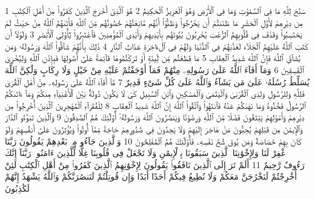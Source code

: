 {\tiny\colorbox{cl_aya}{1}} سَبَّحَ لِلَّهِ مَا فِى ٱلسَّمَٰوَٰتِ وَمَا فِى ٱلْأَرْضِ وَهُوَ ٱلْعَزِيزُ ٱلْحَكِيمُ
{\tiny\colorbox{cl_aya}{2}} هُوَ ٱلَّذِىٓ أَخْرَجَ ٱلَّذِينَ كَفَرُوا۟ مِنْ أَهْلِ ٱلْكِتَٰبِ مِن دِيَٰرِهِمْ لِأَوَّلِ ٱلْحَشْرِ مَا ظَنَنتُمْ أَن يَخْرُجُوا۟ وَظَنُّوٓا۟ أَنَّهُم مَّانِعَتُهُمْ حُصُونُهُم مِّنَ ٱللَّهِ فَأَتَىٰهُمُ ٱللَّهُ مِنْ حَيْثُ لَمْ يَحْتَسِبُوا۟ وَقَذَفَ فِى قُلُوبِهِمُ ٱلرُّعْبَ يُخْرِبُونَ بُيُوتَهُم بِأَيْدِيهِمْ وَأَيْدِى ٱلْمُؤْمِنِينَ فَٱعْتَبِرُوا۟ يَٰٓأُو۟لِى ٱلْأَبْصَٰرِ
{\tiny\colorbox{cl_aya}{3}} وَلَوْلَآ أَن كَتَبَ ٱللَّهُ عَلَيْهِمُ ٱلْجَلَآءَ لَعَذَّبَهُمْ فِى ٱلدُّنْيَا وَلَهُمْ فِى ٱلْءَاخِرَةِ عَذَابُ ٱلنَّارِ
{\tiny\colorbox{cl_aya}{4}} ذَٰلِكَ بِأَنَّهُمْ شَآقُّوا۟ ٱللَّهَ وَرَسُولَهُۥ وَمَن يُشَآقِّ ٱللَّهَ فَإِنَّ ٱللَّهَ شَدِيدُ ٱلْعِقَابِ
{\tiny\colorbox{cl_aya}{5}} مَا قَطَعْتُم مِّن لِّينَةٍ أَوْ تَرَكْتُمُوهَا قَآئِمَةً عَلَىٰٓ أُصُولِهَا فَبِإِذْنِ ٱللَّهِ وَلِيُخْزِىَ ٱلْفَٰسِقِينَ
{\tiny\colorbox{cl_aya}{6}} وَمَآ أَفَآءَ ٱللَّهُ عَلَىٰ رَسُولِهِۦ مِنْهُمْ فَمَآ أَوْجَفْتُمْ عَلَيْهِ مِنْ خَيْلٍ وَلَا رِكَابٍ وَلَٰكِنَّ ٱللَّهَ يُسَلِّطُ رُسُلَهُۥ عَلَىٰ مَن يَشَآءُ وَٱللَّهُ عَلَىٰ كُلِّ شَىْءٍ قَدِيرٌ
{\tiny\colorbox{cl_aya}{7}} مَّآ أَفَآءَ ٱللَّهُ عَلَىٰ رَسُولِهِۦ مِنْ أَهْلِ ٱلْقُرَىٰ فَلِلَّهِ وَلِلرَّسُولِ وَلِذِى ٱلْقُرْبَىٰ وَٱلْيَتَٰمَىٰ وَٱلْمَسَٰكِينِ وَٱبْنِ ٱلسَّبِيلِ كَىْ لَا يَكُونَ دُولَةًۢ بَيْنَ ٱلْأَغْنِيَآءِ مِنكُمْ وَمَآ ءَاتَىٰكُمُ ٱلرَّسُولُ فَخُذُوهُ وَمَا نَهَىٰكُمْ عَنْهُ فَٱنتَهُوا۟ وَٱتَّقُوا۟ ٱللَّهَ إِنَّ ٱللَّهَ شَدِيدُ ٱلْعِقَابِ
{\tiny\colorbox{cl_aya}{8}} لِلْفُقَرَآءِ ٱلْمُهَٰجِرِينَ ٱلَّذِينَ أُخْرِجُوا۟ مِن دِيَٰرِهِمْ وَأَمْوَٰلِهِمْ يَبْتَغُونَ فَضْلًا مِّنَ ٱللَّهِ وَرِضْوَٰنًا وَيَنصُرُونَ ٱللَّهَ وَرَسُولَهُۥٓ أُو۟لَٰٓئِكَ هُمُ ٱلصَّٰدِقُونَ
{\tiny\colorbox{cl_aya}{9}} وَٱلَّذِينَ تَبَوَّءُو ٱلدَّارَ وَٱلْإِيمَٰنَ مِن قَبْلِهِمْ يُحِبُّونَ مَنْ هَاجَرَ إِلَيْهِمْ وَلَا يَجِدُونَ فِى صُدُورِهِمْ حَاجَةً مِّمَّآ أُوتُوا۟ وَيُؤْثِرُونَ عَلَىٰٓ أَنفُسِهِمْ وَلَوْ كَانَ بِهِمْ خَصَاصَةٌ وَمَن يُوقَ شُحَّ نَفْسِهِۦ فَأُو۟لَٰٓئِكَ هُمُ ٱلْمُفْلِحُونَ
{\tiny\colorbox{cl_aya}{10}} وَٱلَّذِينَ جَآءُو مِنۢ بَعْدِهِمْ يَقُولُونَ رَبَّنَا ٱغْفِرْ لَنَا وَلِإِخْوَٰنِنَا ٱلَّذِينَ سَبَقُونَا بِٱلْإِيمَٰنِ وَلَا تَجْعَلْ فِى قُلُوبِنَا غِلًّا لِّلَّذِينَ ءَامَنُوا۟ رَبَّنَآ إِنَّكَ رَءُوفٌ رَّحِيمٌ
{\tiny\colorbox{cl_aya}{11}} أَلَمْ تَرَ إِلَى ٱلَّذِينَ نَافَقُوا۟ يَقُولُونَ لِإِخْوَٰنِهِمُ ٱلَّذِينَ كَفَرُوا۟ مِنْ أَهْلِ ٱلْكِتَٰبِ لَئِنْ أُخْرِجْتُمْ لَنَخْرُجَنَّ مَعَكُمْ وَلَا نُطِيعُ فِيكُمْ أَحَدًا أَبَدًا وَإِن قُوتِلْتُمْ لَنَنصُرَنَّكُمْ وَٱللَّهُ يَشْهَدُ إِنَّهُمْ لَكَٰذِبُونَ

